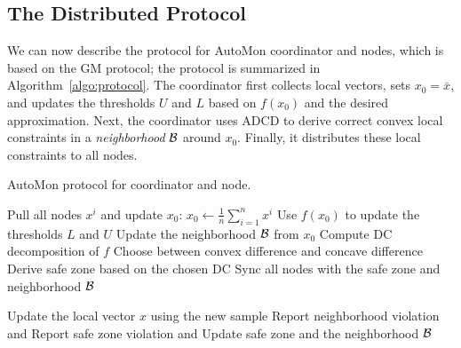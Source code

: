 \subsection{The Distributed Protocol}
\label{sub_sec:basic-protocol}

We can now describe the protocol for AutoMon coordinator and nodes, which is based on the GM protocol;
the protocol is summarized in Algorithm~\ref{algo:protocol}.
The coordinator first collects local vectors, sets $x_0 = \bar{x}$, and updates the thresholds $U$ and $L$ based on $f(x_0)$ and the desired approximation.
Next, the coordinator uses ADCD to derive correct convex local constraints in a \emph{neighborhood} $\mathcal{B}$ around $x_0$.
Finally, it distributes these local constraints to all nodes.

\begin{algorithm}
	\caption{AutoMon protocol for coordinator and node.}
	\label{algo:protocol}
	\begin{algorithmic}[1]
		 \label{step:full-sync}
		\State Pull all nodes $x^i$ and update $x_0$: $x_0 \leftarrow \frac{1}{n} \sum_{i=1}^{n} x^i$  \label{step:update-ref-point}
		\State Use $f(x_0)$ to update the thresholds $L$ and $U$
		\State Update the neighborhood $\mathcal{B}$ from  $x_0$ 
		\State Compute DC decomposition of $f$
		\State Choose between convex difference and concave difference
		\State Derive safe zone based on the chosen DC
		\State Sync all nodes with the safe zone and neighborhood $\mathcal{B}$
		\EndProcedure

		\State Update the local vector $x$ using the new sample
		 Report neighborhood violation and \oldReturn 
		\EndIf \label{step:neighborhood-check}
		 Report safe zone violation and \oldReturn
		\EndIf  \label{step:safezone-check}
		\EndProcedure		
		\State Update safe zone and the neighborhood $\mathcal{B}$
		\EndProcedure
	\end{algorithmic}
\end{algorithm}


